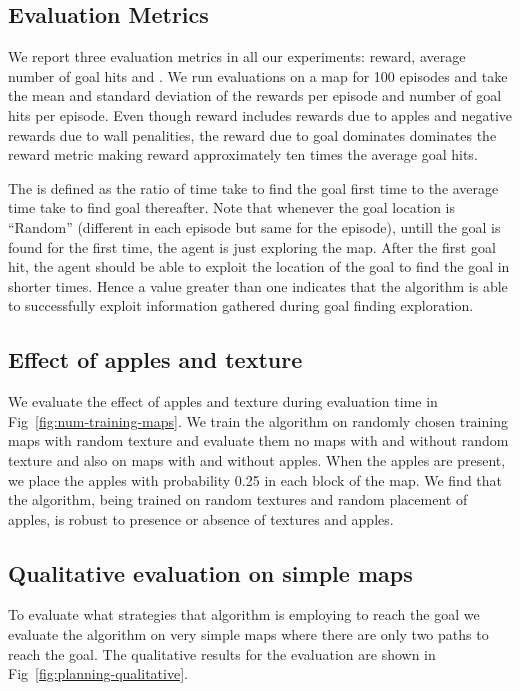 \subsection{Evaluation Metrics}
We report three evaluation metrics in all our experiments: reward, average number of goal hits and \LatencyOneGtOne{}. We run evaluations on a map for 100 episodes and take the mean and standard deviation of the rewards per episode and number of goal hits per episode. Even though reward includes rewards due to apples and negative rewards due to wall penalities, the reward due to goal dominates dominates the reward metric making reward approximately ten times the average goal hits.

The \LatencyOneGtOne{} is defined as the ratio of time take to find the goal first time to the average time take to find goal thereafter.
Note that whenever the goal location is ``Random'' (different in each episode but same for the episode), untill the goal is found for the first time, the agent is just exploring the map.
After the first goal hit, the agent should be able to exploit the location of the goal to find the goal in shorter times.
Hence a \LatencyOneGtOne{} value greater than one indicates that the algorithm is able to successfully exploit information gathered during goal finding exploration.


\subsection{Effect of apples and texture}
We evaluate the effect of apples and texture during evaluation time in Fig~\ref{fig:num-training-maps}.
We train the algorithm on randomly chosen training maps with random texture and evaluate them no maps with and without random texture and also on maps with and without apples. When the apples are present, we place the apples with probability 0.25 in each block of the map.
We find that the algorithm, being trained on random textures and random placement of apples, is robust to presence or absence of textures and apples.


\subsection{Qualitative evaluation on simple maps}
To evaluate what strategies that algorithm is employing to reach the
goal we evaluate the algorithm on very simple maps where there are only two
paths to reach the goal. The qualitative results for the evaluation are shown
in Fig~\ref{fig:planning-qualitative}.

